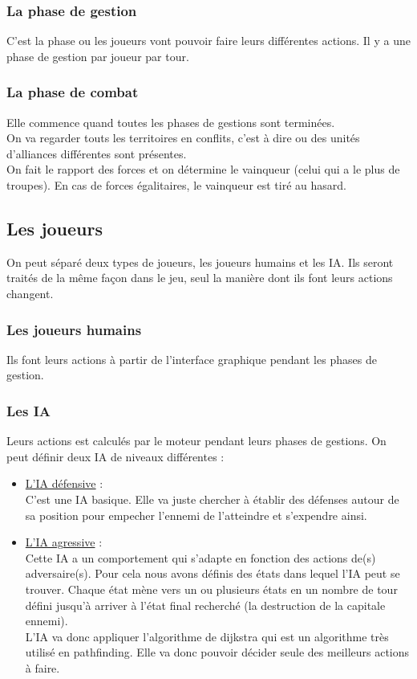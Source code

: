       \subsubsection{La phase de gestion}
	C'est la phase ou les joueurs vont pouvoir faire leurs différentes actions. Il y a une phase de gestion par joueur par tour.
	
      \subsubsection{La phase de combat}
	Elle commence quand toutes les phases de gestions sont terminées. \\
	On va regarder touts les territoires en conflits, c'est à dire ou des unités d'alliances différentes sont présentes. \\
	On fait le rapport des forces et on détermine le vainqueur (celui qui a le plus de troupes). En cas de forces égalitaires, le vainqueur est tiré au hasard.
    
    \subsection{Les joueurs}
      On peut séparé deux types de joueurs, les joueurs humains et les IA. Ils seront traités de la même façon dans le jeu, seul la manière dont ils font leurs actions changent.
      
      \subsubsection{Les joueurs humains}
	Ils font leurs actions à partir de l'interface graphique pendant les phases de gestion.
    
      \subsubsection{Les IA}
	Leurs actions est calculés par le moteur pendant leurs phases de gestions. On peut définir deux IA de niveaux différentes :
	\begin{itemize}
	 \item \underline{L'IA défensive} : \\
	  C'est une IA basique. Elle va juste chercher à établir des défenses autour de sa position pour empecher l'ennemi de l'atteindre et s'expendre ainsi.
	 \item \underline{L'IA agressive} : \\
	  Cette IA a un comportement qui s'adapte en fonction des actions de(s) adversaire(s). Pour cela nous avons définis des états dans lequel l'IA peut se trouver.
	  Chaque état mène vers un ou plusieurs états en un nombre de tour défini jusqu'à arriver à l'état final recherché (la destruction de la capitale ennemi). \\
	  L'IA va donc appliquer l'algorithme de dijkstra qui est un algorithme très utilisé en pathfinding. Elle va donc pouvoir décider seule des meilleurs actions à faire.
	\end{itemize}

